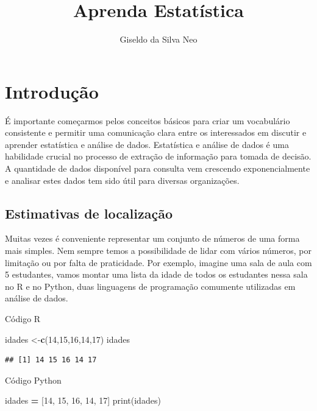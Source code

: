 \documentclass[
]{book}
\title{Aprenda Estatística}
\author{Giseldo da Silva Neo}
\date{}
\newenvironment{Shaded}{\begin{snugshade}}{\end{snugshade}}
\newcommand{\BuiltInTok}[1]{#1}
\newcommand{\DecValTok}[1]{\textcolor[rgb]{0.00,0.00,0.81}{#1}}
\newcommand{\FunctionTok}[1]{\textcolor[rgb]{0.13,0.29,0.53}{\textbf{#1}}}
\newcommand{\NormalTok}[1]{#1}
\newcommand{\OperatorTok}[1]{\textcolor[rgb]{0.81,0.36,0.00}{\textbf{#1}}}
\newcommand{\OtherTok}[1]{\textcolor[rgb]{0.56,0.35,0.01}{#1}}
\begin{document}
\maketitle

{
\setcounter{tocdepth}{1}
\tableofcontents
}
\chapter{Introdução}\label{introduuxe7uxe3o}

É importante começarmos pelos conceitos básicos para criar um vocabulário consistente e permitir uma comunicação clara entre os interessados em discutir e aprender estatística e análise de dados. Estatística e análise de dados é uma habilidade crucial no processo de extração de informação para tomada de decisão. A quantidade de dados disponível para consulta vem crescendo exponencialmente e analisar estes dados tem sido útil para diversas organizações.

\section{Estimativas de localização}\label{estimativas-de-localizauxe7uxe3o}

Muitas vezes é conveniente representar um conjunto de números de uma forma mais simples. Nem sempre temos a possibilidade de lidar com vários números, por limitação ou por falta de praticidade. Por exemplo, imagine uma sala de aula com 5 estudantes, vamos montar uma lista da idade de todos os estudantes nessa sala no R e no Python, duas linguagens de programação comumente utilizadas em análise de dados.

Código R

\begin{Shaded}
\begin{Highlighting}[]
\NormalTok{idades }\OtherTok{\textless{}{-}}\FunctionTok{c}\NormalTok{(}\DecValTok{14}\NormalTok{,}\DecValTok{15}\NormalTok{,}\DecValTok{16}\NormalTok{,}\DecValTok{14}\NormalTok{,}\DecValTok{17}\NormalTok{)}
\NormalTok{idades}
\end{Highlighting}
\end{Shaded}

\begin{verbatim}
## [1] 14 15 16 14 17
\end{verbatim}

Código Python

\begin{Shaded}
\begin{Highlighting}[]
\NormalTok{idades }\OperatorTok{=}\NormalTok{ [}\DecValTok{14}\NormalTok{, }\DecValTok{15}\NormalTok{, }\DecValTok{16}\NormalTok{, }\DecValTok{14}\NormalTok{, }\DecValTok{17}\NormalTok{]}
\BuiltInTok{print}\NormalTok{(idades)}
\end{Highlighting}
\end{Shaded}
\end{document}
